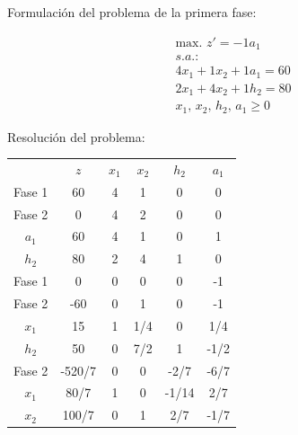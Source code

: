 Formulación del problema de la primera fase:

\begin{equation}
\begin{split}
\mbox{max. } z' = -1a_1\\
s.a.:\\
4x_1+1x_2+1a_1 = 60\\
2x_1+4x_2+1h_2 = 80\\
x_1,\,x_2,\,h_2,\,a_1\geq 0\end{split}
\end{equation}

Resolución del problema:

\begin{center}
\begin{tabular}{c|c|cccc|}
    & $z$ & $x_1$ & $x_2$ & $h_2$ & $a_1$\\ 
Fase 1 & 60 & 4 & 1 & 0 & 0 \\ 
Fase 2 & 0 & 4 & 2 & 0 & 0 \\ 
\hline
$a_1$ & 60  & 4 & 1 & 0 & 1\\ 
$h_2$ & 80  & 2 & 4 & 1 & 0\\ 
\hline
Fase 1 & 0 & 0 & 0 & 0 & -1 \\ 
Fase 2 & -60 & 0 & 1 & 0 & -1 \\ 
\hline
$x_1$ & 15  & 1 & 1/4 & 0 & 1/4\\ 
$h_2$ & 50  & 0 & 7/2 & 1 & -1/2\\ 
\hline
Fase 2 & -520/7 & 0 & 0 & -2/7 & -6/7 \\ 
\hline
$x_1$ & 80/7  & 1 & 0 & -1/14 & 2/7\\ 
$x_2$ & 100/7  & 0 & 1 & 2/7 & -1/7\\ 
\hline
\end{tabular}
\end{center}




